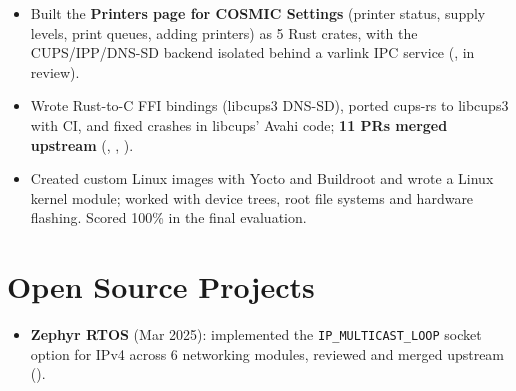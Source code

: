 \documentclass[10pt]{article}
\begin{document}
\begin{itemize}
  \item Built the \textbf{Printers page for COSMIC Settings} (printer status, supply levels, print queues, adding printers) as 5 Rust crates, with the CUPS/IPP/DNS-SD backend isolated behind a varlink IPC service (, in review).
  \item Wrote Rust-to-C FFI bindings (libcups3 DNS-SD), ported cups-rs to libcups3 with CI, and fixed crashes in libcups' Avahi code; \textbf{11 PRs merged upstream} (, , ).
\end{itemize}
\begin{itemize}
  \item Created custom Linux images with Yocto and Buildroot and wrote a Linux kernel module; worked with device trees, root file systems and hardware flashing. Scored 100\% in the final evaluation.
\end{itemize}

\section*{Open Source Projects}
\begin{itemize}
  \item \textbf{Zephyr RTOS} (Mar 2025): implemented the \texttt{IP\_MULTICAST\_LOOP} socket option for IPv4 across 6 networking modules, reviewed and merged upstream ().
\end{itemize}
\end{document}
